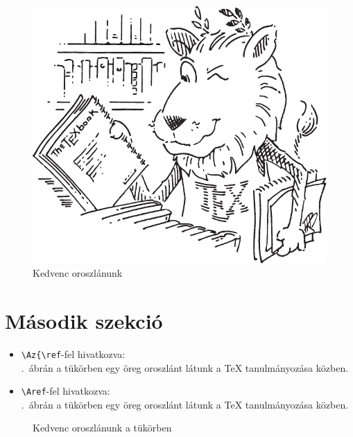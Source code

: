\documentclass{article}
\begin{document}
\begin{figure}[htbp]
\centering
\includegraphics[scale=0.25]{Lion}
\caption{Kedvenc oroszlánunk}
\label{fig:lion1}
\end{figure}

\section{Második szekció}\label{sec-somethingelse}
\begin{itemize}
\item	
\verb!\Az{\ref!-fel hivatkozva:\\ \Az{\ref{fig:lion2}}.~ábrán a tükörben egy öreg oroszlánt látunk a \TeX{} tanulmányozása közben.
\item
\verb!\Aref!-fel hivatkozva:\\ .~ábrán  a tükörben egy öreg oroszlánt látunk a \TeX{} tanulmányozása közben.
\end{itemize}
%
\begin{figure}[htbp]
\centering
{}
\caption{Kedvenc oroszlánunk a tükörben}
\label{fig:lion2}
\end{figure}
\end{document}
